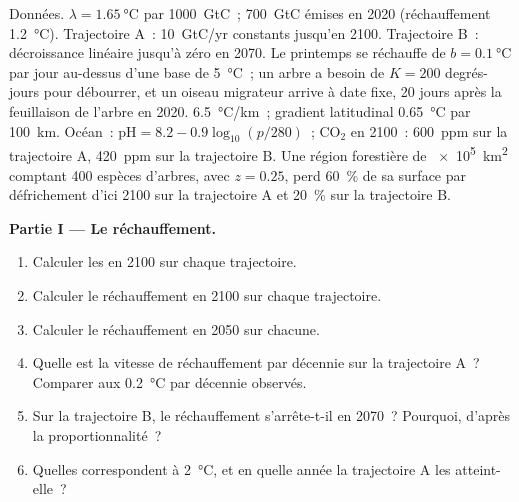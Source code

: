 \begin{problem}
\label{pb:b2:global-change:1}
Données. $\lambda = \qty{1.65}{\celsius}$ par \qty{1000}{GtC}~;
\qty{700}{GtC} émises en 2020 (réchauffement \qty{1.2}{\celsius}).
Trajectoire A~: \qty{10}{GtC/yr} constants jusqu'en 2100. Trajectoire B~:
décroissance linéaire jusqu'à zéro en 2070. Le printemps se réchauffe de
$b = \qty{0.1}{\celsius}$ par jour au-dessus d'une base de
\qty{5}{\celsius}~; un arbre a besoin de $K = 200$ degrés-jours pour
débourrer, et un oiseau migrateur arrive à date fixe, 20 jours après la
feuillaison de l'arbre en 2020. 
\qty{6.5}{\celsius/km}~; gradient latitudinal \qty{0.65}{\celsius} par
\qty{100}{km}. Océan~: $\mathrm{pH} = 8.2 - 0.9\log_{10}(p/280)$~;
\ensuremath{\mathrm{CO_2}} en 2100~: \qty{600}{ppm} sur la trajectoire A,
\qty{420}{ppm} sur la trajectoire B.
Une région forestière de \qty{e5}{km^2} comptant 400 espèces d'arbres,
avec $z = 0.25$, perd \qty{60}{\%} de sa surface par défrichement d'ici
2100 sur la trajectoire A et
\qty{20}{\%} sur la trajectoire B.

\medskip
\noindent\textbf{Partie I --- Le réchauffement.}
\begin{enumerate}
  \item Calculer les  en 2100 sur chaque trajectoire.
  \item Calculer le réchauffement en 2100 sur chaque trajectoire.
  \item Calculer le réchauffement en 2050 sur chacune.
  \item Quelle est la vitesse de réchauffement par décennie sur la
        trajectoire A~? Comparer aux \qty{0.2}{\celsius} par décennie
        observés.
  \item Sur la trajectoire B, le réchauffement s'arrête-t-il en 2070~?
        Pourquoi, d'après la proportionnalité~?
  \item Quelles  correspondent à \qty{2}{\celsius}, et
        en quelle année la trajectoire A les atteint-elle~?
\end{enumerate}


\end{problem}
